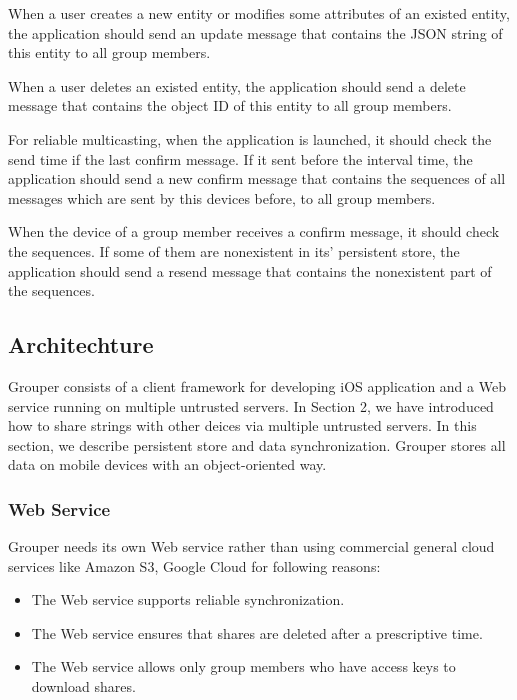 \documentclass[twocolumn,10pt]{article}
\begin{document}
When a user creates a new entity or modifies some attributes of an existed entity, the application should send an update message that contains the JSON string of this entity to all group members.

When a user deletes an existed entity, the application should send a delete message that contains the object ID of this entity to all group members.

For reliable multicasting, when the application is launched, it should check the send time if the last confirm message. If it sent before the interval time, the application should send a new confirm message that contains the sequences of all messages which are sent by this devices before, to all group members.

When the device of a group member receives a confirm message, it should check the sequences. If some of them are nonexistent in its' persistent store, the application should send a resend message that contains the nonexistent part of the sequences.

\subsection{Architechture}
Grouper consists of a client framework for developing iOS application and a Web service running on multiple untrusted servers. In Section 2, we have introduced how to share strings with other deices via multiple untrusted servers. In this section, we describe persistent store and data synchronization. Grouper stores all data on mobile devices with an object-oriented way.

\subsubsection{Web Service}
Grouper needs its own Web service rather than using commercial general cloud services like Amazon S3, Google Cloud for following reasons:

\begin{itemize}
	\setlength{\itemsep}{1pt}
	\setlength{\parskip}{0pt}
	\setlength{\parsep}{0pt}
	\item The Web service supports reliable synchronization.
	\item The Web service ensures that shares are deleted after a prescriptive time.
	\item The Web service allows only group members who have access keys to download shares.
\end{itemize}
\end{document}
